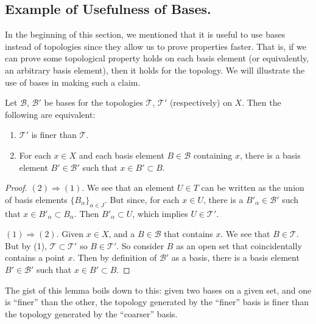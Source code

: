 \subsection{Example of Usefulness of Bases.}
\begin{prob}
In the beginning of this section, we mentioned that it is useful
to use bases instead of topologies since they allow us to prove
properties faster. That is, if we can prove some topological
property holds on each basis element (or equivalently, an
arbitrary basis element), then it holds for the topology. We will
illustrate the use of bases in making such a claim.
\end{prob}
\begin{lem}\label{lem:finerBasesEqualsFinerTopologies}
Let $\mathscr{B}$, $\mathscr{B}'$ be bases for the topologies
$\mathcal{T}$, $\mathcal{T}'$ (respectively) on $X$. Then the
following are equivalent:
\begin{enumerate}
\item $\mathcal{T}'$ is finer than $\mathcal{T}$.
\item For each $x\in X$ and each basis element $B\in\mathscr{B}$
  containing $x$, there is a basis element $B'\in{\mathscr{B}}'$
  such that $x\in B'\subset B$.
\end{enumerate}
\end{lem}
\begin{proof}
$(2)\Rightarrow(1).$ We see that an element $U\in T$ can be
  written as the union of basis elements
  $\{B_{\alpha}\}_{\alpha\in J}$. But since, for each $x\in U$,
  there is a $B'_{\alpha}\in\mathscr{B}'$ such that
  $x\in B'_{\alpha}\subset B_{\alpha}$. Then $B'_{\alpha}\subset
  U$, which implies $U\in\mathcal{T}'$.

\noindent$(1)\Rightarrow(2).$ Given $x\in X$, and a
$B\in\mathscr{B}$ that contains $x$. We see that
$B\in\mathcal{T}$. But by (1), $\mathcal{T}\subset\mathcal{T}'$
so $B\in\mathcal{T}'$. So consider $B$ as an open set that
coincidentally contains a point $x$. Then by definition of
$\mathscr{B}'$ as a basis, there is a basis element
$B'\in\mathscr{B}'$ such that $x\in B'\subset B$.
\end{proof}
\begin{rmk}
The gist of this lemma boils down to this: given two bases on a
given set, and one is ``finer'' than the other, the topology
generated by the ``finer'' basis is finer than the topology
generated by the ``coarser'' basis.
\end{rmk}
